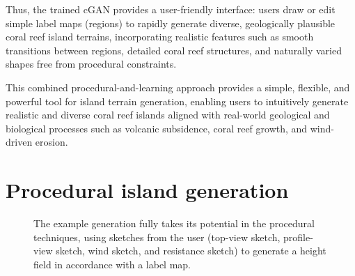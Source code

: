 Thus, the trained cGAN provides a user-friendly interface: users draw or edit simple label maps (regions) to rapidly generate diverse, geologically plausible coral reef island terrains, incorporating realistic features such as smooth transitions between regions, detailed coral reef structures, and naturally varied shapes free from procedural constraints.

\midConclusion

This combined procedural-and-learning approach provides a simple, flexible, and powerful tool for island terrain generation, enabling users to intuitively generate realistic and diverse coral reef islands aligned with real-world geological and biological processes such as volcanic subsidence, coral reef growth, and wind-driven erosion.






















\section{Procedural island generation}
\label{sec:coral-island_example-generation}

\begin{figure}[H]
	\centering
    \caption{The example generation fully takes its potential in the procedural techniques, using sketches from the user (top-view sketch, profile-view sketch, wind sketch, and resistance sketch) to generate a height field in accordance with a label map. }
    \label{fig:coral-island_example-pipeline}
\end{figure}





